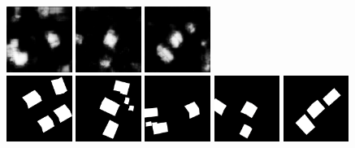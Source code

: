 \documentclass[12pt,a4paper]{article}
\begin{document}
\begin{figure}[p]
        \includegraphics[width=0.19\textwidth]{images/data_withjosm/predictions/539}
        \includegraphics[width=0.19\textwidth]{images/data_withjosm/predictions/551}
        \includegraphics[width=0.19\textwidth]{images/data_withjosm/predictions/553}
        \\[1px]
        \includegraphics[width=0.19\textwidth]{images/data_onlydida/labels_by_hand/535}
        \includegraphics[width=0.19\textwidth]{images/data_onlydida/labels_by_hand/537}
        \includegraphics[width=0.19\textwidth]{images/data_onlydida/labels_by_hand/539}
        \includegraphics[width=0.19\textwidth]{images/data_onlydida/labels_by_hand/551}
        \includegraphics[width=0.19\textwidth]{images/data_onlydida/labels_by_hand/553}
        

\end{figure}
\end{document}
